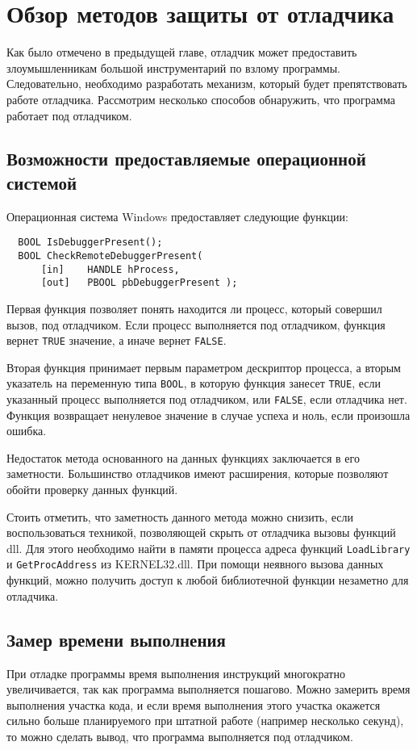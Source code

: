 
\section{Обзор методов защиты от отладчика}
Как было отмечено в предыдущей главе, отладчик может предоставить
злоумышленникам большой инструментарий по взлому программы. Следовательно,
необходимо разработать механизм, который будет препятствовать работе отладчика.
Рассмотрим несколько способов обнаружить, что программа работает под отладчиком.

\subsection{Возможности предоставляемые операционной системой}
Операционная система Windows предоставляет следующие функции:
\begin{verbatim}
  BOOL IsDebuggerPresent();
  BOOL CheckRemoteDebuggerPresent(
      [in]    HANDLE hProcess,
      [out]   PBOOL pbDebuggerPresent );
\end{verbatim}

Первая функция позволяет понять находится ли процесс, который совершил вызов,
под отладчиком. Если процесс выполняется под отладчиком, функция вернет
\verb!TRUE! значение, а иначе вернет \verb!FALSE!.

Вторая функция принимает первым параметром дескриптор процесса, а вторым
указатель на переменную типа \verb!BOOL!, в которую функция занесет \verb!TRUE!,
если указанный процесс выполняется под отладчиком, или \verb!FALSE!, если
отладчика нет. Функция возвращает ненулевое значение в случае успеха и ноль,
если произошла ошибка.

Недостаток метода основанного на данных функциях заключается в его заметности.
Большинство отладчиков имеют расширения, которые позволяют обойти проверку
данных функций.

Стоить отметить, что заметность данного метода можно снизить, если
воспользоваться техникой, позволяющей скрыть от отладчика вызовы функций dll.
Для этого необходимо найти в памяти процесса адреса функций \verb!LoadLibrary! и
\verb!GetProcAddress! из KERNEL32.dll. При помощи неявного вызова данных
функций, можно получить доступ к любой библиотечной функции незаметно для
отладчика. 

\subsection{Замер времени выполнения}
При отладке программы время выполнения инструкций многократно увеличивается, так
как программа выполняется пошагово. Можно замерить время выполнения участка
кода, и если время выполнения этого участка окажется сильно больше планируемого
при штатной работе (например несколько секунд), то можно сделать вывод, что
программа выполняется под отладчиком.


